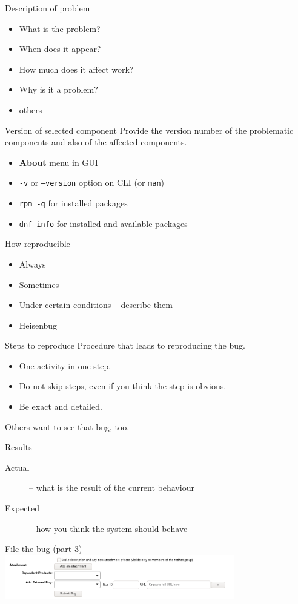 \documentclass[12pt]{beamer}
\begin{document}
\begin{frame}{Description of problem}
\begin{itemize}
	\item What is the problem?
	\item When does it appear?
	\item How much does it affect work?
	\item Why is it a problem?
	\item others
\end{itemize}
\end{frame}

\begin{frame}{Version of selected component}
Provide the version number of the problematic components and also of the affected components.
\begin{itemize}
	\item \textbf{About} menu in GUI
	\item \texttt{-v} or \texttt{--version} option on CLI (or \texttt{man})
	\item \texttt{rpm -q} for installed packages
	\item \texttt{dnf info} for installed and available packages
\end{itemize}
\end{frame}

\begin{frame}{How reproducible}
\begin{itemize}
	\item Always
	\item Sometimes
	\item Under certain conditions -- describe them
	\item Heisenbug 
\end{itemize}
\end{frame}

\begin{frame}{Steps to reproduce}
Procedure that leads to reproducing the bug.
\begin{itemize}
	\item One activity in one step.
	\item Do not skip steps, even if you think the step is obvious.
	\item Be exact and detailed.
\end{itemize}
Others want to see that bug, too. 
\end{frame}

\begin{frame}{Results}
\begin{description}
	\item[Actual] -- what is the result of the current behaviour
	\item[Expected] -- how you think the system should behave
\end{description}
\end{frame}

\begin{frame}{File the bug (part 3)}
\includegraphics[width=10cm]{images/bz_footer.png}
\end{frame}
\end{document}
